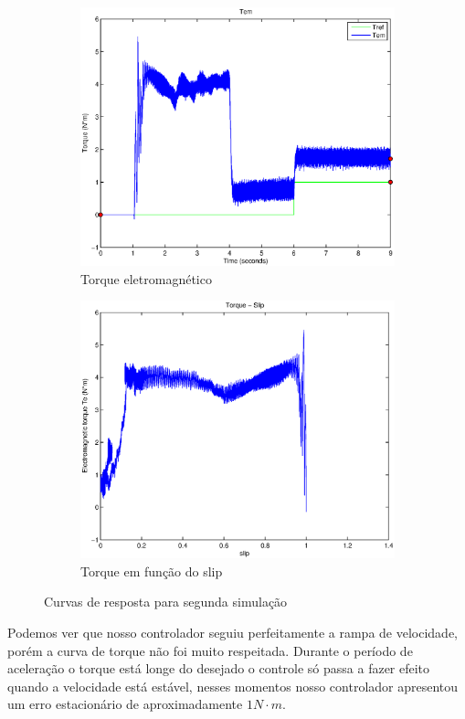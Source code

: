 \documentclass{article}
\begin{document}
\begin{figure}[H]
\begin{subfigure}[b]{0.49\linewidth}
		\includegraphics[width=\linewidth]{matlab/tem2}
		\caption{Torque eletromagnético}
	\end{subfigure}
	\begin{subfigure}[b]{0.49\linewidth}
		\centering
		\includegraphics[width=\linewidth]{matlab/ts2}
		\caption{Torque em função do slip}
	\end{subfigure}
	\caption{Curvas de resposta para segunda simulação}
	\label{fig:s2}
\end{figure}

Podemos ver que nosso controlador seguiu perfeitamente a rampa de velocidade, porém a curva de torque não foi muito respeitada. Durante o período de aceleração o torque está longe do desejado o controle só passa a fazer efeito quando a velocidade está estável, nesses momentos nosso controlador apresentou um erro estacionário de aproximadamente $1 N\cdot m$.
\end{document}
